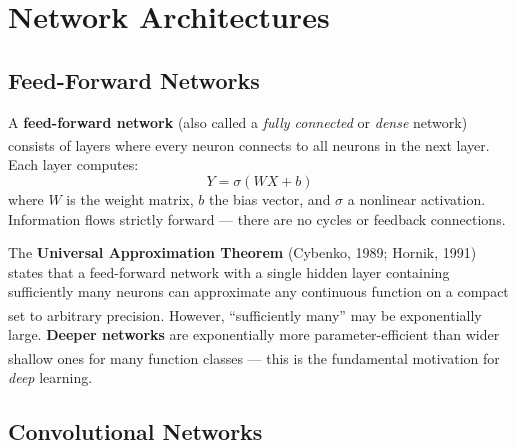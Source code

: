 \section{Network Architectures}

\subsection{Feed-Forward Networks}

\begin{tcbitemize}[ skin=sectionraster ]
    \tcbitem[title={Dense Layers}, raster multicolumn=3]
    A \textbf{feed-forward network} (also called a \emph{fully connected} or \emph{dense} network) consists of layers where every neuron connects to all neurons in the next layer\textsuperscript{\cite[][pp.~15--17]{fleuretLittleBookDeep}}.
    Each layer computes:
    \begin{equation}
        Y = \sigma(WX + b)
    \end{equation}
    where $W$ is the weight matrix, $b$ the bias vector, and $\sigma$ a nonlinear activation.
    Information flows strictly forward --- there are no cycles or feedback connections.

    \tcbitem[title={Universal Approximation}, raster multicolumn=3]
    The \textbf{Universal Approximation Theorem} (Cybenko, 1989; Hornik, 1991) states that a feed-forward network with a single hidden layer containing sufficiently many neurons can approximate any continuous function on a compact set to arbitrary precision\textsuperscript{\cite[][p.~16]{fleuretLittleBookDeep}}.
    However, ``sufficiently many'' may be exponentially large.
    \textbf{Deeper networks} are exponentially more parameter-efficient than wider shallow ones for many function classes\textsuperscript{\cite[][pp.~8--12]{robertsPrinciplesDeepLearning2022}} --- this is the fundamental motivation for \emph{deep} learning.
\end{tcbitemize}

\subsection{Convolutional Networks}

